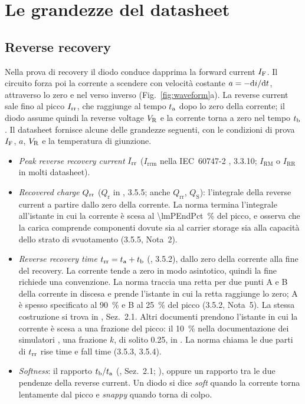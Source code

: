 \documentclass[10pt,a4paper]{scrartcl}
\let\newcommand\lmitdefine
\newcommand{\IF}{I_\mathrm{F}}
\newcommand{\VR}{V_\mathrm{R}}
\newcommand{\Irr}{I_\mathrm{rr}}
\newcommand{\Qrr}{Q_\mathrm{rr}}
\newcommand{\trr}{t_\mathrm{rr}}
\newcommand{\ta}{t_\mathrm{a}}
\newcommand{\tb}{t_\mathrm{b}}
\newcommand{\diff}{\mathrm{d}}
\begin{document}
\section{Le grandezze del datasheet}
\label{sec:datasheet}
\subsection{Reverse recovery}
\label{sec:rrdata}
Nella prova di recovery il diodo conduce dapprima la forward current $\IF$. Il circuito forza poi la corrente a scendere con velocità costante $a = -\diff i/\diff t$, attraverso lo zero e nel verso inverso (Fig.~\ref{fig:waveform}a). La reverse current sale fino al picco $\Irr$, che raggiunge al tempo $\ta$ dopo lo zero della corrente; il diodo assume quindi la reverse voltage $\VR$ e la corrente torna a zero nel tempo $\tb$. Il datasheet fornisce alcune delle grandezze seguenti, con le condizioni di prova $\IF$, $a$, $\VR$ e la temperatura di giunzione.
\begin{itemize}
\item \emph{Peak reverse recovery current} $\Irr$ ($I_\mathrm{rrm}$ nella IEC~60747-2 \cite{iec60747}, 3.3.10; $I_\mathrm{RM}$ o $I_\mathrm{RR}$ in molti datasheet).
\item \emph{Recovered charge} $\Qrr$ ($Q_\mathrm{r}$ in \cite{iec60747}, 3.5.5; anche $Q_\mathrm{rr}$, $Q_\mathrm{S}$): l'integrale della reverse current a partire dallo zero della corrente. La norma termina l'integrale all'istante in cui la corrente è scesa al \SI{\lmPEndPct}{\percent} del picco, e osserva che la carica comprende componenti dovute sia al carrier storage sia alla capacità dello strato di svuotamento (3.5.5, Nota~2).
\item \emph{Reverse recovery time} $\trr = \ta + \tb$ (\cite{iec60747}, 3.5.2), dallo zero della corrente alla fine del recovery. La corrente tende a zero in modo asintotico, quindi la fine richiede una convenzione. La norma traccia una retta per due punti A e B della corrente in discesa e prende l'istante in cui la retta raggiunge lo zero; A è spesso specificato al \SI{90}{\percent} e B al \SI{25}{\percent} del picco (3.5.2, Nota~5). La stessa costruzione si trova in \cite{an6481}, Sez.~2.1. Altri documenti prendono l'istante in cui la corrente è scesa a una frazione del picco: il \SI{10}{\percent} nella documentazione dei simulatori \cite{mathworks,plecs}, una frazione $k$, di solito \num{0.25}, in \cite{an5028}. La norma chiama le due parti di $\trr$ rise time e fall time (3.5.3, 3.5.4).
\item \emph{Softness}: il rapporto $\tb/\ta$ (\cite{an6481}, Sez.~2.1; \cite{an5028}), oppure un rapporto tra le due pendenze della reverse current. Un diodo si dice \emph{soft} quando la corrente torna lentamente dal picco e \emph{snappy} quando torna di colpo.
\end{itemize}
\end{document}
